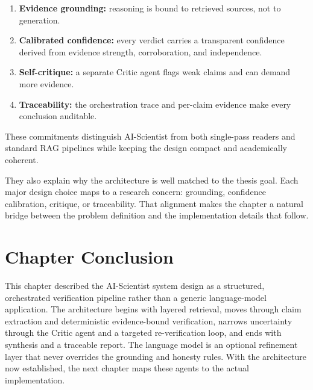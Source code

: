 \begin{enumerate}
\item \textbf{Evidence grounding:} reasoning is bound to retrieved sources, not to generation.
\item \textbf{Calibrated confidence:} every verdict carries a transparent confidence derived from evidence
strength, corroboration, and independence.
\item \textbf{Self-critique:} a separate Critic agent flags weak claims and can demand more evidence.
\item \textbf{Traceability:} the orchestration trace and per-claim evidence make every conclusion auditable.
\end{enumerate}

These commitments distinguish AI-Scientist from both single-pass readers and standard RAG pipelines while keeping
the design compact and academically coherent.

They also explain why the architecture is well matched to the thesis goal. Each major design choice maps to a
research concern: grounding, confidence calibration, critique, or traceability. That alignment makes the chapter a
natural bridge between the problem definition and the implementation details that follow.

\section{Chapter Conclusion }

This chapter described the AI-Scientist system design as a structured, orchestrated verification pipeline rather
than a generic language-model application. The architecture begins with layered retrieval, moves through claim
extraction and deterministic evidence-bound verification, narrows uncertainty through the Critic agent and a
targeted re-verification loop, and ends with synthesis and a traceable report. The language model is an optional
refinement layer that never overrides the grounding and honesty rules. With the architecture now established, the
next chapter maps these agents to the actual implementation.

